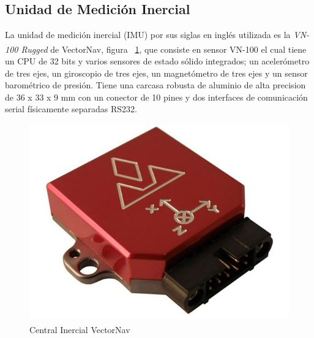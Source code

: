 \subsection{Unidad de Medici\'{o}n Inercial}

La unidad de medici\'{o}n inercial (IMU) por sus siglas en ingl\'{e}s utilizada es la \textit{VN-100 Rugged} de VectorNav\textsuperscript{\textregistered}, figura ~\ref{fig:IMU}, que consiste en sensor VN-100 el cual tiene un CPU de 32 bits y varios sensores de estado s\'{o}lido integrados; un aceler\'{o}metro de tres ejes, un giroscopio de tres ejes, un magnet\'{o}metro de tres ejes y un sensor barom\'{e}trico de presi\'{o}n. Tiene una carcasa robusta de aluminio de alta precision de 36 x 33 x 9 mm con un conector de 10 pines y dos interfaces de comunicaci\'{o}n serial f\'{i}sicamente separadas RS232. 

\begin{figure}[H]
\centering \includegraphics[scale=0.4]{img/VN100.jpg}
\caption{Central Inercial VectorNav\textsuperscript{\textregistered}}
\label{fig:IMU}
\end{figure} 

